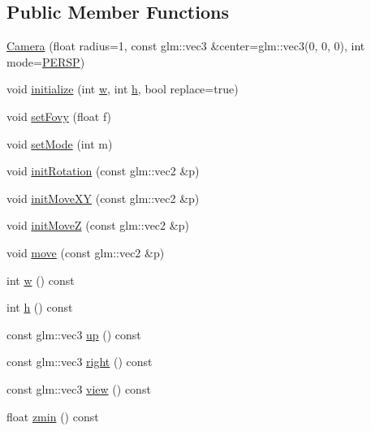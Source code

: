 \subsection*{Public Member Functions}
\begin{DoxyCompactItemize}
\item 
\mbox{\hyperlink{class_camera_a9dcca190d009dad8bf772a7eee20c3b0}{Camera}} (float radius=1, const glm\+::vec3 \&center=glm\+::vec3(0, 0, 0), int mode=\mbox{\hyperlink{class_camera_a522ee90309c2918e4b9695fcdccd061c}{P\+E\+R\+SP}})
\item 
void \mbox{\hyperlink{class_camera_a01a5063edbbce200df991b5fd8761621}{initialize}} (int \mbox{\hyperlink{class_camera_a8695ceeb4597517ca9f2e09284f2506f}{w}}, int \mbox{\hyperlink{class_camera_a6a6e5717e8dd4bfaf6c9546a5cc09dc4}{h}}, bool replace=true)
\item 
void \mbox{\hyperlink{class_camera_ac21d2ee509fb8df94333a839b0892d54}{set\+Fovy}} (float f)
\item 
void \mbox{\hyperlink{class_camera_a9a436317f1a6e867f8eaa6affd6e80e5}{set\+Mode}} (int m)
\item 
void \mbox{\hyperlink{class_camera_af24fe5e14b2ba41196b95ad4a2eabb7c}{init\+Rotation}} (const glm\+::vec2 \&p)
\item 
void \mbox{\hyperlink{class_camera_a9f48e576aa251e716d97c32ac85bd7c4}{init\+Move\+XY}} (const glm\+::vec2 \&p)
\item 
void \mbox{\hyperlink{class_camera_a89c903f8ff8b16fccd8544af273ece2d}{init\+MoveZ}} (const glm\+::vec2 \&p)
\item 
void \mbox{\hyperlink{class_camera_a7ac215b4c76c1864c8c339127f4586ef}{move}} (const glm\+::vec2 \&p)
\item 
int \mbox{\hyperlink{class_camera_a8695ceeb4597517ca9f2e09284f2506f}{w}} () const
\item 
int \mbox{\hyperlink{class_camera_a6a6e5717e8dd4bfaf6c9546a5cc09dc4}{h}} () const
\item 
const glm\+::vec3 \mbox{\hyperlink{class_camera_adbbc2231e34b78b5b5b08a2aa16fc71d}{up}} () const
\item 
const glm\+::vec3 \mbox{\hyperlink{class_camera_a0f9545b5f7787ddc62f2d3a0f1e3c6d6}{right}} () const
\item 
const glm\+::vec3 \mbox{\hyperlink{class_camera_abbd1a0e73fd627b08d357524a7f1b8ab}{view}} () const
\item 
float \mbox{\hyperlink{class_camera_adf4779e2bc0dac7b719f4350c0db07f3}{zmin}} () const
\item 

\end{DoxyCompactItemize}
